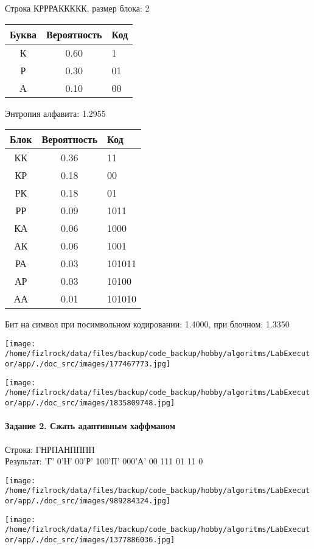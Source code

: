 \documentclass[a4paper, 12pt]{article}
\begin{document}
Строка КРРРАККККК, размер блока: 2
\begin{center}
 \begin{tabular}{ |c|c|l| } 
  \hline
     Буква & Вероятность & Код\\ \hline
К & 0.60 & 1\\\hline
Р & 0.30 & 01\\\hline
А & 0.10 & 00
\\ \hline \end{tabular}
\end{center}
Энтропия алфавита: 1.2955
\begin{center}
 \begin{tabular}{ |c|c|l| } 
  \hline
     Блок & Вероятность & Код\\ \hline
КК & 0.36 & 11\\\hline
КР & 0.18 & 00\\\hline
РК & 0.18 & 01\\\hline
РР & 0.09 & 1011\\\hline
КА & 0.06 & 1000\\\hline
АК & 0.06 & 1001\\\hline
РА & 0.03 & 101011\\\hline
АР & 0.03 & 10100\\\hline
АА & 0.01 & 101010
\\ \hline \end{tabular}
\end{center}
Бит на символ при посимвольном кодировании: 1.4000, при блочном: 1.3350

\texttt{[image: /home/fizlrock/data/files/backup/code\_backup/hobby/algoritms/LabExecutor/app/./doc\_src/images/177467773.jpg]}

\texttt{[image: /home/fizlrock/data/files/backup/code\_backup/hobby/algoritms/LabExecutor/app/./doc\_src/images/1835809748.jpg]}
\pagebreak
\paragraph{Задание 2. Сжать адаптивным хаффманом\\}

Строка: 
ГНРПАНПППП\\
Результат: 'Г' 0'Н' 00'Р' 100'П' 000'А' 00 111 01 11 0

\texttt{[image: /home/fizlrock/data/files/backup/code\_backup/hobby/algoritms/LabExecutor/app/./doc\_src/images/989284324.jpg]}

\texttt{[image: /home/fizlrock/data/files/backup/code\_backup/hobby/algoritms/LabExecutor/app/./doc\_src/images/1377886036.jpg]}
\end{document}
